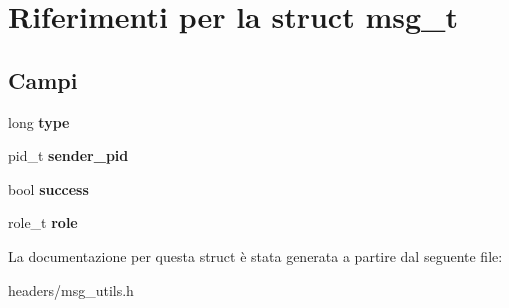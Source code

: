 \hypertarget{structmsg__t}{}\section{Riferimenti per la struct msg\+\_\+t}
\label{structmsg__t}
\subsection*{Campi}
\begin{DoxyCompactItemize}
\item 
\mbox{\label{structmsg__t_a2ad6ce7195598089716f7de41436c63a}} 
long {\bfseries type}
\item 
\mbox{\label{structmsg__t_ae79f37d3dc8230fd465f68f694bbc059}} 
pid\+\_\+t {\bfseries sender\+\_\+pid}
\item 
\mbox{\label{structmsg__t_a36de2353b53229696559d6deb7e7cd63}} 
bool {\bfseries success}
\item 
\mbox{\label{structmsg__t_aa82183c66909d325a8f33526abc6f7e1}} 
role\+\_\+t {\bfseries role}
\end{DoxyCompactItemize}


La documentazione per questa struct è stata generata a partire dal seguente file\+:\begin{DoxyCompactItemize}
\item 
headers/msg\+\_\+utils.\+h\end{DoxyCompactItemize}
